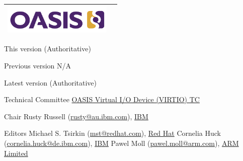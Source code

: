 \begin{titlepage}
\thispagestyle{fancy}

\begin{tabular*}{\textwidth}{@{\extracolsep{\fill}}lr}
	\includegraphics[height=0.55in]{images/oasis.png}\\
	\hline
\end{tabular*}

\oasistitle{\virtioversion}
\oasisstagelabel{\virtiodraftstagename\virtiodraftstageextratitle}
\vspace{0.05in}
\oasisstagelabel{\virtioworkingdraftdate}


\begin{oasistitlesection}{This version}
\virtiourlpdf (Authoritative)\newline
\virtiourlhtml
\end{oasistitlesection}

\begin{oasistitlesection}{Previous version}
N/A
\end{oasistitlesection}

\begin{oasistitlesection}{Latest version}
\virtiourllatestpdf (Authoritative)\newline
\virtiourllatesthtml
\end{oasistitlesection}

\begin{oasistitlesection}{Technical Committee}
\href{https://www.oasis-open.org/committees/virtio/}{OASIS Virtual I/O Device (VIRTIO) TC}
\end{oasistitlesection}

\begin{oasistitlesection}{Chair}
Rusty Russell (\href{mailto:rusty@au.ibm.com}{rusty@au.ibm.com}), \href{http://www.ibm.com/}{IBM}\newline
\end{oasistitlesection}

\begin{oasistitlesection}{Editors}
Michael S. Tsirkin (\href{mailto:mst@redhat.com}{mst@redhat.com}), \href{http://redhat.com/}{Red Hat}\newline
Cornelia Huck (\href{mailto:cornelia.huck@de.ibm.com}{cornelia.huck@de.ibm.com}), \href{http://www.ibm.com/}{IBM}\newline
Pawel Moll (\href{mailto:pawel.moll@arm.com}{pawel.moll@arm.com}), \href{https://arm.com/}{ARM Limited}
\end{oasistitlesection}



\end{titlepage}
